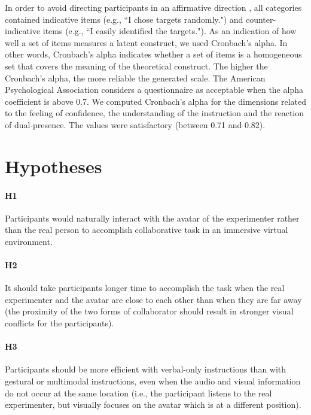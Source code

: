 In order to avoid directing participants in an affirmative direction \citep{Dillman2000Mail}, all categories contained indicative items (e.g., ``I chose targets randomly.") and counter-indicative items (e.g., ``I easily identified the targets."). As an indication of how well a set of items measures a latent construct, we used Cronbach's alpha. In other words, Cronbach's alpha indicates whether a set of items is a homogeneous set that covers the meaning of the theoretical construct. The higher the Cronbach's alpha, the more reliable the generated scale. The American Psychological Association considers a questionnaire as acceptable when the alpha coefficient is above 0.7. We computed Cronbach's alpha for the dimensions related to the feeling of confidence, the understanding of the instruction and the reaction of dual-presence. The values were satisfactory (between 0.71 and 0.82).



\section{Hypotheses}

\paragraph{H1}
Participants would naturally interact with the avatar of the experimenter rather than the real person to accomplish collaborative task in an immersive virtual environment.

\paragraph{H2} It should take participants longer time to accomplish the task when the real experimenter and the avatar are close to each other than when they are far away (the proximity of the two forms of collaborator should result in stronger visual conflicts for the participants).

\paragraph{H3} Participants should be more efficient with verbal-only instructions than with gestural or multimodal instructions, even when the audio and visual information do not occur at the same location (i.e., the participant listens to the real experimenter, but visually focuses on the avatar which is at a different position).



